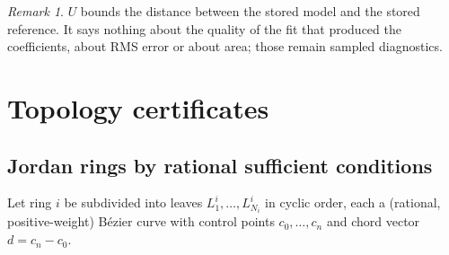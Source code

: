 \documentclass[11pt,a4paper]{article}
\theoremstyle{definition}
\theoremstyle{remark}
\newtheorem{remark}[theorem]{Remark}
\begin{document}
\begin{remark}
$U$ bounds the distance between the stored model and the stored reference. It
says nothing about the quality of the fit that produced the coefficients, about
RMS error or about area; those remain sampled diagnostics.
\end{remark}

\section{Topology certificates}

\subsection{Jordan rings by rational sufficient conditions}

Let ring $i$ be subdivided into leaves $L^i_1,\dots,L^i_{N_i}$ in cyclic order,
each a (rational, positive-weight) B\'ezier curve with control points
$c_0,\dots,c_n$ and chord vector $d=c_n-c_0$.
\end{document}
